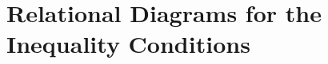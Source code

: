 \documentclass[\econtexRoot/BufferStockTheory]{subfiles}
\begin{document}
\section{Relational Diagrams for the Inequality Conditions}\label{sec:ApndxConditionDiagrams}
\end{document}
